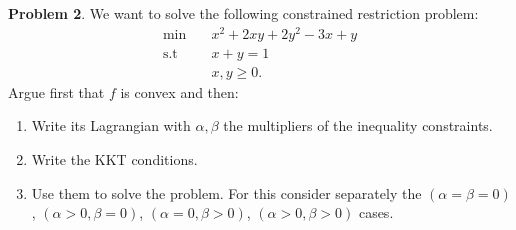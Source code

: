 \documentclass[a4paper]{article}
\newenvironment{problem}[2][Problem]
    { \begin{mdframed}[backgroundcolor=gray!20] \vspace*{0.1cm} \textbf{#1 #2}.}
    {  \end{mdframed}\vspace{0.3cm}}
\begin{document}
\begin{problem}{2}
We want to solve the following constrained restriction problem:
\begin{align*}
  \min \quad       & x^{2} + 2xy + 2y^2 - 3x + y \\
  \text{s.t} \quad & x + y = 1                   \\
                   & x,y \geq 0.
\end{align*}
Argue first that \(f\) is convex and then:
\begin{enumerate}
  \item Write its Lagrangian with \(\alpha,\beta\) the multipliers of the inequality constraints.
  \item Write the KKT conditions.
  \item Use them to solve the problem. For this consider separately the \((\alpha = \beta = 0)\), \((\alpha > 0, \beta = 0)\), \((\alpha = 0, \beta > 0)\), \((\alpha > 0, \beta > 0)\) cases.
\end{enumerate}
\end{problem}
\end{document}
